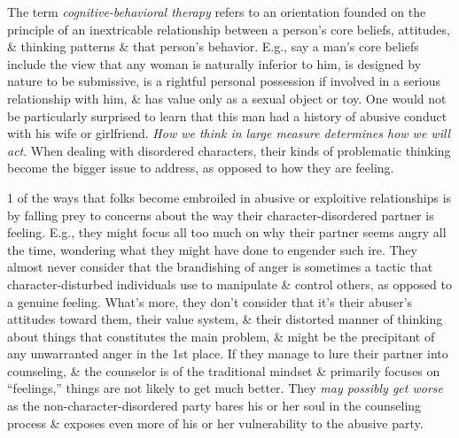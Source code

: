 \documentclass{article}
\numberwithin{equation}{section}
\begin{document}
The term \textit{cognitive-behavioral therapy} refers to an orientation founded on the principle of an inextricable relationship between a person's core beliefs, attitudes, \& thinking patterns \& that person's behavior. E.g., say a man's core beliefs include the view that any woman is naturally inferior to him, is designed by nature to be submissive, is a rightful personal possession if involved in a serious relationship with him, \& has value only as a sexual object or toy. One would not be particularly surprised to learn that this man had a history of abusive conduct with his wife or girlfriend. \textit{How we think in large measure determines how we will act}. When dealing with disordered characters, their kinds of problematic thinking become the bigger issue to address, as opposed to how they are feeling.

1 of the ways that folks become embroiled in abusive or exploitive relationships is by falling prey to concerns about the way their character-disordered partner is feeling. E.g., they might focus all too much on why their partner seems angry all the time, wondering what they might have done to engender such ire. They almost never consider that the brandishing of anger is sometimes a tactic that character-disturbed individuals use to manipulate \& control others, as opposed to a genuine feeling. What's more, they don't consider that it's their abuser's attitudes toward them, their value system, \& their distorted manner of thinking about things that constitutes the main problem, \& might be the precipitant of any unwarranted anger in the 1st place. If they manage to lure their partner into counseling, \& the counselor is of the traditional mindset \& primarily focuses on ``feelings,'' things are not likely to get much better. They \textit{may possibly get worse} as the non-character-disordered party bares his or her soul in the counseling process \& exposes even more of his or her vulnerability to the abusive party.
\end{document}
